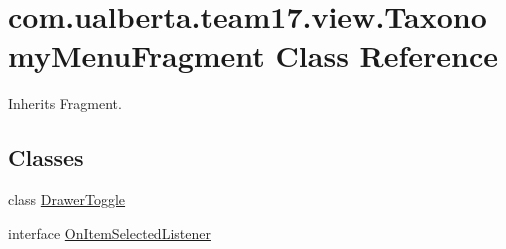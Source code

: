 \hypertarget{classcom_1_1ualberta_1_1team17_1_1view_1_1_taxonomy_menu_fragment}{\section{com.\+ualberta.\+team17.\+view.\+Taxonomy\+Menu\+Fragment Class Reference}
\label{classcom_1_1ualberta_1_1team17_1_1view_1_1_taxonomy_menu_fragment}
}


Inherits Fragment.

\subsection*{Classes}
\begin{DoxyCompactItemize}
\item 
class \hyperlink{classcom_1_1ualberta_1_1team17_1_1view_1_1_taxonomy_menu_fragment_1_1_drawer_toggle}{Drawer\+Toggle}
\item 
interface \hyperlink{interfacecom_1_1ualberta_1_1team17_1_1view_1_1_taxonomy_menu_fragment_1_1_on_item_selected_listener}{On\+Item\+Selected\+Listener}
\end{DoxyCompactItemize}
